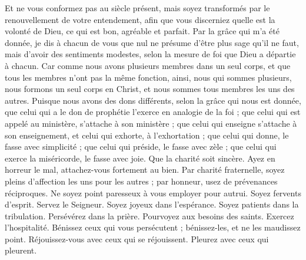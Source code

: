 \begin{multicols}{2}
Et ne vous conformez pas au siècle présent, mais soyez transformés par le renouvellement de votre entendement, afin que vous discerniez quelle est la volonté de Dieu, ce qui est bon, agréable et parfait.
Par la grâce qui m’a été donnée, je dis à chacun de vous que nul ne présume d'être plus sage qu'il ne faut, mais d’avoir des sentiments modestes, selon la mesure de foi que Dieu a départie à chacun.
Car comme nous avons plusieurs membres dans un seul corps, et que tous les membres n'ont pas la même fonction,
ainsi, nous qui sommes plusieurs, nous formons un seul corps en Christ, et nous sommes tous membres les uns des autres.
Puisque nous avons des dons différents, selon la grâce qui nous est donnée, que celui qui a le don de prophétie l’exerce en analogie de la foi ;
que celui qui est appelé au ministère, s’attache à son ministère ; que celui qui enseigne s’attache à son enseignement,
et celui qui exhorte, à l’exhortation ; que celui qui donne, le fasse avec simplicité ; que celui qui préside, le fasse avec zèle ; que celui qui exerce la miséricorde, le fasse avec joie.
Que la charité soit sincère. Ayez en horreur le mal, attachez-vous fortement au bien.
Par charité fraternelle, soyez pleins d’affection les uns pour les autres ; par honneur, usez de prévenances réciproques.
Ne soyez point paresseux à vous employer pour autrui. Soyez fervents d'esprit. Servez le Seigneur.
Soyez joyeux dans l'espérance. Soyez patients dans la tribulation. Persévérez dans la prière.
Pourvoyez aux besoins des saints. Exercez l'hospitalité.
Bénissez ceux qui vous persécutent ; bénissez-les, et ne les maudissez point.
Réjouissez-vous avec ceux qui se réjouissent. Pleurez avec ceux qui pleurent.

\end{multicols}
